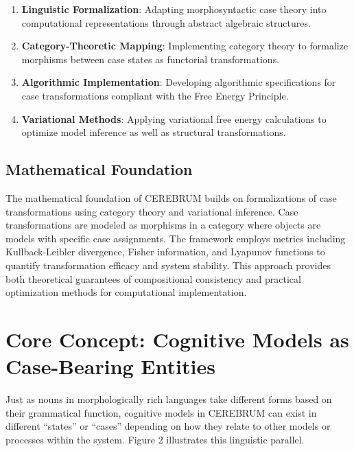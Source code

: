 \begin{enumerate}
\def\labelenumi{\arabic{enumi}.}
\tightlist
\item
  \textbf{Linguistic Formalization}: Adapting morphosyntactic case
  theory into computational representations through abstract algebraic
  structures.
\item
  \textbf{Category-Theoretic Mapping}: Implementing category theory to
  formalize morphisms between case states as functorial transformations.
\item
  \textbf{Algorithmic Implementation}: Developing algorithmic
  specifications for case transformations compliant with the Free Energy
  Principle.
\item
  \textbf{Variational Methods}: Applying variational free energy
  calculations to optimize model inference as well as structural
  transformations.
\end{enumerate}

\hypertarget{mathematical-foundation}{%
\subsection{Mathematical Foundation}\label{mathematical-foundation}}

The mathematical foundation of CEREBRUM builds on formalizations of case
transformations using category theory and variational inference. Case
transformations are modeled as morphisms in a category where objects are
models with specific case assignments. The framework employs metrics
including Kullback-Leibler divergence, Fisher information, and Lyapunov
functions to quantify transformation efficacy and system stability. This
approach provides both theoretical guarantees of compositional
consistency and practical optimization methods for computational
implementation.

\hypertarget{core-concept-cognitive-models-as-case-bearing-entities}{%
\section{Core Concept: Cognitive Models as Case-Bearing
Entities}\label{core-concept-cognitive-models-as-case-bearing-entities}}

Just as nouns in morphologically rich languages take different forms
based on their grammatical function, cognitive models in CEREBRUM can
exist in different ``states'' or ``cases'' depending on how they relate
to other models or processes within the system. Figure 2 illustrates
this linguistic parallel.


